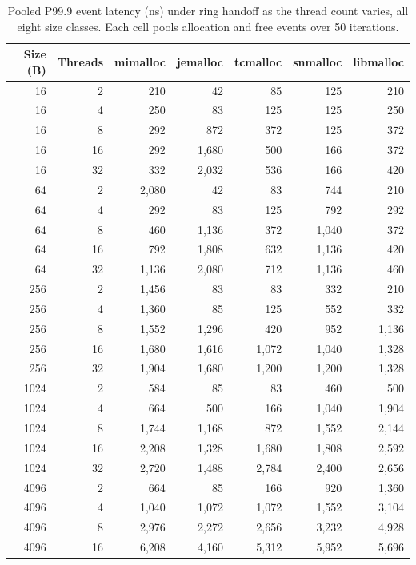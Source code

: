 \begin{table}[!htbp]
\centering
\scriptsize
\setlength{\tabcolsep}{3pt}
\caption{Pooled P99.9 event latency (ns) under ring handoff as the thread count varies, all eight size classes. Each cell pools allocation and free events over 50 iterations.}
\label{tab:scaling-ring}
\begin{tabular}{rrrrrrr}
\toprule
Size (B) & Threads & mimalloc & jemalloc & tcmalloc & snmalloc & libmalloc\\
\midrule
16 & 2 & 210 & 42 & 85 & 125 & 210 \\
16 & 4 & 250 & 83 & 125 & 125 & 250 \\
16 & 8 & 292 & 872 & 372 & 125 & 372 \\
16 & 16 & 292 & 1{,}680 & 500 & 166 & 372 \\
16 & 32 & 332 & 2{,}032 & 536 & 166 & 420 \\
64 & 2 & 2{,}080 & 42 & 83 & 744 & 210 \\
64 & 4 & 292 & 83 & 125 & 792 & 292 \\
64 & 8 & 460 & 1{,}136 & 372 & 1{,}040 & 372 \\
64 & 16 & 792 & 1{,}808 & 632 & 1{,}136 & 420 \\
64 & 32 & 1{,}136 & 2{,}080 & 712 & 1{,}136 & 460 \\
256 & 2 & 1{,}456 & 83 & 83 & 332 & 210 \\
256 & 4 & 1{,}360 & 85 & 125 & 552 & 332 \\
256 & 8 & 1{,}552 & 1{,}296 & 420 & 952 & 1{,}136 \\
256 & 16 & 1{,}680 & 1{,}616 & 1{,}072 & 1{,}040 & 1{,}328 \\
256 & 32 & 1{,}904 & 1{,}680 & 1{,}200 & 1{,}200 & 1{,}328 \\
1024 & 2 & 584 & 85 & 83 & 460 & 500 \\
1024 & 4 & 664 & 500 & 166 & 1{,}040 & 1{,}904 \\
1024 & 8 & 1{,}744 & 1{,}168 & 872 & 1{,}552 & 2{,}144 \\
1024 & 16 & 2{,}208 & 1{,}328 & 1{,}680 & 1{,}808 & 2{,}592 \\
1024 & 32 & 2{,}720 & 1{,}488 & 2{,}784 & 2{,}400 & 2{,}656 \\
4096 & 2 & 664 & 85 & 166 & 920 & 1{,}360 \\
4096 & 4 & 1{,}040 & 1{,}072 & 1{,}072 & 1{,}552 & 3{,}104 \\
4096 & 8 & 2{,}976 & 2{,}272 & 2{,}656 & 3{,}232 & 4{,}928 \\
4096 & 16 & 6{,}208 & 4{,}160 & 5{,}312 & 5{,}952 & 5{,}696 \\

\end{tabular}
\end{table}
